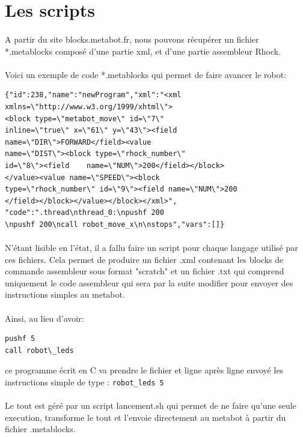 \documentclass[10pt,a4paper]{report}
\begin{document}
\section{Les scripts}
\paragraph{}
A partir du site blocks.metabot.fr, nous pouvons récupérer un fichier *.metablocks composé d'une partie xml, et d'une partie assembleur Rhock.
\paragraph{}
Voici un exemple de code *.metablocks qui permet de faire avancer le robot:
\begin{verbatim}
{"id":238,"name":"newProgram","xml":"<xml
xmlns=\"http://www.w3.org/1999/xhtml\">
<block type=\"metabot_move\" id=\"7\"
inline=\"true\" x=\"61\" y=\"43\"><field
name=\"DIR\">FORWARD</field><value
name=\"DIST\"><block type=\"rhock_number\"
id=\"8\"><field    name=\"NUM\">200</field></block>
</value><value name=\"SPEED\"><block 
type=\"rhock_number\" id=\"9\"><field name=\"NUM\">200
</field></block></value></block></xml>",
"code":".thread\nthread_0:\npushf 200
\npushf 200\ncall robot_move_x\n\nstops","vars":[]}
\end{verbatim}
\paragraph{}
N'étant lisible en l'état, il a fallu faire un script pour chaque langage utilisé par ces fichiers. Cela permet de produire un fichier .xml contenant les blocks de commande assembleur sous format "scratch" et un fichier .txt qui comprend uniquement le code assembleur qui sera par la suite modifier pour envoyer des instructions simples au metabot.

\paragraph{}

Ainsi, au lieu d'avoir:
\begin{verbatim} 
pushf 5 
call robot\_leds
\end{verbatim} 
ce programme écrit en C va prendre le fichier et ligne après ligne envoyé les instructions simple de type : 
\texttt{robot\_leds 5}
\paragraph{}
Le tout est géré par un script lancement.sh qui permet de ne faire qu'une seule execution, transforme le tout et l'envoie directement au metabot à partir du fichier .metablocks.
\end{document}
